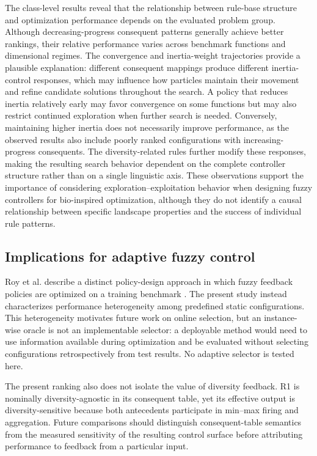 The class-level results reveal that the relationship between rule-base structure and optimization performance depends on the evaluated problem group. Although decreasing-progress consequent patterns generally achieve better rankings, their relative performance varies across benchmark functions and dimensional regimes. The convergence and inertia-weight trajectories provide a plausible explanation: different consequent mappings produce different inertia-control responses, which may influence how particles maintain their movement and refine candidate solutions throughout the search. A policy that reduces inertia relatively early may favor convergence on some functions but may also restrict continued exploration when further search is needed. Conversely, maintaining higher inertia does not necessarily improve performance, as the observed results also include poorly ranked configurations with increasing-progress consequents. The diversity-related rules further modify these responses, making the resulting search behavior dependent on the complete controller structure rather than on a single linguistic axis. These observations support the importance of considering exploration--exploitation behavior when designing fuzzy controllers for bio-inspired optimization, although they do not identify a causal relationship between specific landscape properties and the success of individual rule patterns.


\subsection{Implications for adaptive fuzzy control}
\label{subsec:discussion_implications}

Roy et al. describe a distinct policy-design approach in which fuzzy feedback policies are optimized on a training benchmark \cite{Roy2024}. The present study instead characterizes performance heterogeneity among predefined static configurations. This heterogeneity motivates future work on online selection, but an instance-wise oracle is not an implementable selector: a deployable method would need to use information available during optimization and be evaluated without selecting configurations retrospectively from test results. No adaptive selector is tested here.

The present ranking also does not isolate the value of diversity feedback. R1 is nominally diversity-agnostic in its consequent table, yet its effective output is diversity-sensitive because both antecedents participate in min--max firing and aggregation. Future comparisons should distinguish consequent-table semantics from the measured sensitivity of the resulting control surface before attributing performance to feedback from a particular input.

